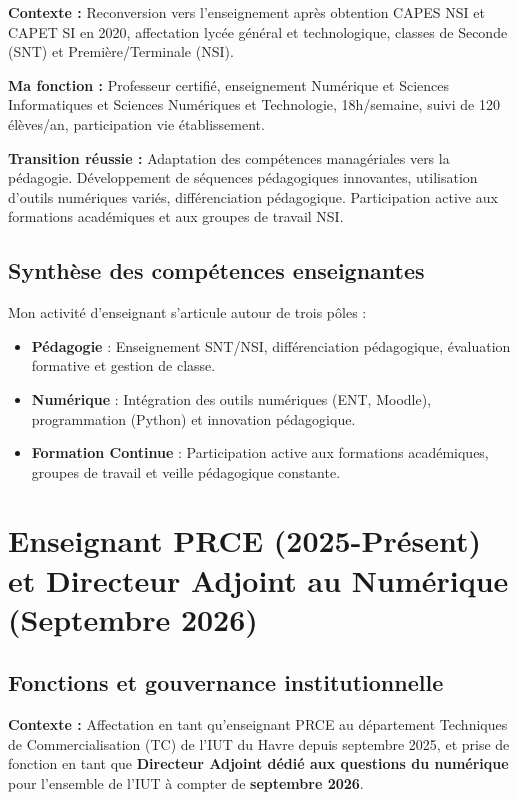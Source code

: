 \textbf{Contexte :} Reconversion vers l'enseignement après obtention CAPES NSI et CAPET SI en 2020, affectation lycée général et technologique, classes de Seconde (SNT) et Première/Terminale (NSI).

\textbf{Ma fonction :} Professeur certifié, enseignement Numérique et Sciences Informatiques et Sciences Numériques et Technologie, 18h/semaine, suivi de 120 élèves/an, participation vie établissement.

\textbf{Transition réussie :} Adaptation des compétences managériales vers la pédagogie. Développement de séquences pédagogiques innovantes, utilisation d'outils numériques variés, différenciation pédagogique. Participation active aux formations académiques et aux groupes de travail NSI.



\subsection{Synthèse des compétences enseignantes}

Mon activité d'enseignant s'articule autour de trois pôles :
\begin{itemize}[leftmargin=*]
    \item \textbf{Pédagogie} : Enseignement SNT/NSI, différenciation pédagogique, évaluation formative et gestion de classe.
    \item \textbf{Numérique} : Intégration des outils numériques (ENT, Moodle), programmation (Python) et innovation pédagogique.
    \item \textbf{Formation Continue} : Participation active aux formations académiques, groupes de travail et veille pédagogique constante.
\end{itemize}

\section{Enseignant PRCE (2025-Présent) et Directeur Adjoint au Numérique (Septembre 2026)}

\subsection{Fonctions et gouvernance institutionnelle}

\textbf{Contexte :} Affectation en tant qu'enseignant PRCE au département Techniques de Commercialisation (TC) de l'IUT du Havre depuis septembre 2025, et prise de fonction en tant que \textbf{Directeur Adjoint dédié aux questions du numérique} pour l'ensemble de l'IUT à compter de \textbf{septembre 2026}.


